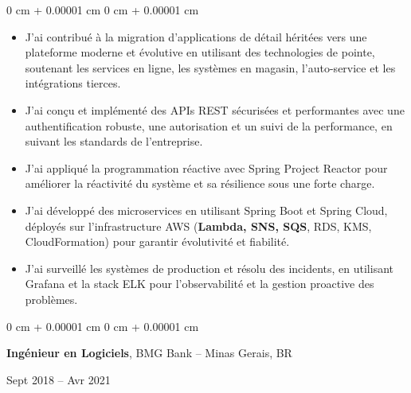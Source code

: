 \documentclass[10pt, letterpaper]{article}
\newenvironment{highlights}{
    \begin{itemize}[
        topsep=0.10 cm,
        parsep=0.10 cm,
        partopsep=0pt,
        itemsep=0pt,
        leftmargin=0 cm + 10pt
    ]
}{
    \end{itemize}
} %
\newenvironment{onecolentry}{
    \begin{adjustwidth}{
        0 cm + 0.00001 cm
    }{
        0 cm + 0.00001 cm
    }
}{
    \end{adjustwidth}
} %
\newenvironment{twocolentry}[2][]{
    \onecolentry
    \def\secondColumn{#2}
    \setcolumnwidth{\fill, 4.5 cm}
    \begin{paracol}{2}
}{
    \switchcolumn \raggedleft \secondColumn
    \end{paracol}
    \endonecolentry
} %
\begin{document}
        \begin{onecolentry}
            \begin{highlights}
                \item J'ai contribué à la migration d'applications de détail héritées vers une plateforme moderne et évolutive en utilisant des technologies de pointe, soutenant les services en ligne, les systèmes en magasin, l'auto-service et les intégrations tierces.
                \item J'ai conçu et implémenté des APIs REST sécurisées et performantes avec une authentification robuste, une autorisation et un suivi de la performance, en suivant les standards de l'entreprise.
                \item J'ai appliqué la programmation réactive avec Spring Project Reactor pour améliorer la réactivité du système et sa résilience sous une forte charge.
                \item J'ai développé des microservices en utilisant Spring Boot et Spring Cloud, déployés sur l'infrastructure AWS (\textbf{Lambda, SNS, SQS}, RDS, KMS, CloudFormation) pour garantir évolutivité et fiabilité.
                \item J'ai surveillé les systèmes de production et résolu des incidents, en utilisant Grafana et la stack ELK pour l'observabilité et la gestion proactive des problèmes.
            \end{highlights}
        \end{onecolentry}
        
        \vspace{0.2 cm}

        \begin{twocolentry}{
            Sept 2018 – Avr 2021
        }
            \textbf{Ingénieur en Logiciels}, BMG Bank -- Minas Gerais, BR
        \end{twocolentry}

        \vspace{0.10 cm}
        
\end{document}
